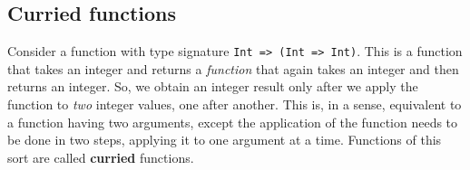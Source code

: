 \begin{comment}
ABC has the first argument which can be matched with this type let's
check what is the type of QQ of ABC it is this this is a function
whose first argument is yes parentheses so let's copy that so this
must equal this if that can be matched with some choice of ABC F T
then we're done there are no other problems how can this be matched
so again the only way that this can be matched is when the left is
a function of some X to some Y and the right also is a function from
some X to some one the same x and y now the left is a function from
this to see the right is a function from F to this remember there's
implicitly there are these parentheses here therefore f must equal
this and C must equal this okay can we do this of course we can F
can be equal to this and once that is true C must be equal to that
so let's put parentheses here and I'll paste it in alright so now
we can put this instead of F in here so that's right code actually
some parameters C T whatever actually C will be equal to that so a
B and T will remain and then we get QQ of a B C of Q of F C right
now let's paste so f is equal to this and C is equal to that and now
everything is green so now we can do option enter here and it will
infer the type so the type of this expression is actually this which
is the same as the type of QQ up to changing C 2 T so we can rename
this to C and it will be exactly the same type so this is very interesting
we we have Q of Q of this type and Q of Q of Q is again of this type
so clearly we can continue doing this Q of Q of Q of Q of Q and it
will still have the same type up to some complicated substitutions
in the types now this example I admit is quite artificial but this
serves to show you how type reasoning works here are some exercises
for you and you can apply the typed reasoning as I just showed you
in the same way and I encourage you to do these exercises 
\end{comment}


\subsection{Curried functions}

Consider a function with type signature \lstinline!Int => (Int => Int)!.
This is a function that takes an integer and returns a \emph{function}
that again takes an integer and then returns an integer. So, we obtain
an integer result only after we apply the function to \emph{two} integer
values, one after another. This is, in a sense, equivalent to a function
having two arguments, except the application of the function needs
to be done in two steps, applying it to one argument at a time. Functions
of this sort are called \textbf{curried} functions.

